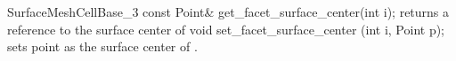 \begin{ccRefConcept}{SurfaceMeshCellBase_3}
\ccMethod
{const Point&   get_facet_surface_center(int i);}
{returns a reference to the surface center of }
\ccGlue
\ccMethod
{void set_facet_surface_center (int i, Point p);} 
{sets point  as the surface center of }.


    




\ccHasModels



\ccSeeAlso

 \\






\end{ccRefConcept}


